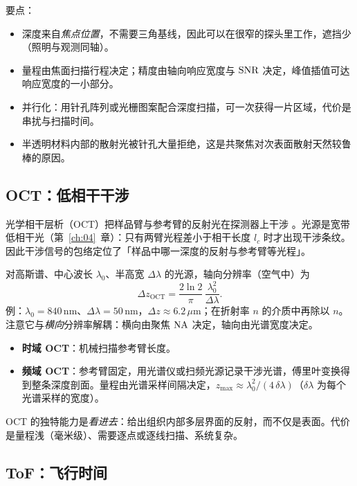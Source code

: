 要点：
\begin{itemize}
  \item 深度来自\emph{焦点位置}，不需要三角基线，因此可以在很窄的探头里工作，遮挡少（照明与观测同轴）。
  \item 量程由焦面扫描行程决定；精度由轴向响应宽度与 $\mathrm{SNR}$ 决定，峰值插值可达响应宽度的一小部分。
  \item 并行化：用针孔阵列或光栅图案配合深度扫描，可一次获得一片区域，代价是串扰与扫描时间。
  \item 半透明材料内部的散射光被针孔大量拒绝，这是共聚焦对次表面散射天然较鲁棒的原因。
\end{itemize}

\subsection{OCT：低相干干涉}

光学相干层析（OCT）把样品臂与参考臂的反射光在探测器上干涉 \citep{Huang1991OCT}。光源是宽带低相干光（第~\ref{ch:04}~章）：只有两臂光程差小于相干长度 $l_c$ 时才出现干涉条纹。因此干涉信号的包络定位了「样品中哪一深度的反射与参考臂等光程」。

对高斯谱、中心波长 $\lambda_0$、半高宽 $\Delta\lambda$ 的光源，轴向分辨率（空气中）为
\begin{equation}
  \Delta z_{\mathrm{OCT}}=\frac{2\ln2}{\pi}\,\frac{\lambda_0^{2}}{\Delta\lambda}.
  \label{eq:ch10-oct}
\end{equation}
例：$\lambda_0=840\,\mathrm{nm}$、$\Delta\lambda=50\,\mathrm{nm}$，$\Delta z\approx6.2\,\mu\mathrm{m}$；在折射率 $n$ 的介质中再除以 $n$。注意它与\emph{横向}分辨率解耦：横向由聚焦 $\mathrm{NA}$ 决定，轴向由光谱宽度决定。

\begin{itemize}
  \item \textbf{时域 OCT}：机械扫描参考臂长度。
  \item \textbf{频域 OCT}：参考臂固定，用光谱仪或扫频光源记录干涉光谱，傅里叶变换得到整条深度剖面。量程由光谱采样间隔决定，$z_{\max}\approx\lambda_0^2/(4\,\delta\lambda)$（$\delta\lambda$ 为每个光谱采样的宽度）。
\end{itemize}
OCT 的独特能力是\emph{看进去}：给出组织内部多层界面的反射，而不仅是表面。代价是量程浅（毫米级）、需要逐点或逐线扫描、系统复杂。

\subsection{ToF：飞行时间}


